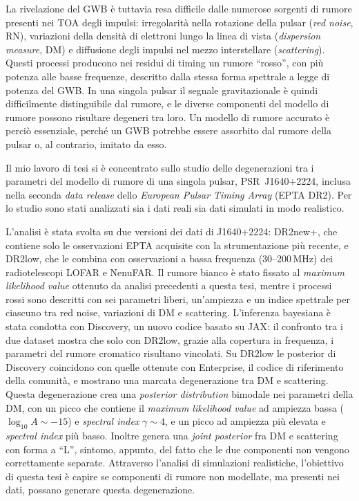 \documentclass[12pt]{report}
\begin{document}
La rivelazione del GWB è tuttavia resa difficile dalle numerose sorgenti di rumore
presenti nei TOA degli impulsi: irregolarità nella rotazione della pulsar
(\textit{red noise}, RN), variazioni della densità di elettroni lungo la linea di
vista (\textit{dispersion measure}, DM) e diffusione degli impulsi nel mezzo
interstellare (\textit{scattering}). Questi processi producono nei residui di
timing un rumore ``rosso'', con più potenza alle basse frequenze, descritto dalla
stessa forma spettrale a legge di potenza del GWB. In una singola pulsar il
segnale gravitazionale è quindi difficilmente distinguibile dal rumore, e le
diverse componenti del modello di rumore possono risultare degeneri tra loro.
Un modello di rumore accurato è perciò essenziale, perché un GWB potrebbe essere
assorbito dal rumore della pulsar o, al contrario, imitato da esso. \par

Il mio lavoro di tesi si è concentrato sullo studio delle degenerazioni tra i
parametri del modello di rumore di una singola pulsar, PSR~J1640+2224, inclusa
nella seconda \textit{data release} dello \textit{European Pulsar Timing Array}
(EPTA DR2). Per lo studio sono stati analizzati sia i dati reali sia dati simulati
in modo realistico. \par

L'analisi è stata svolta su due versioni dei dati di J1640+2224: DR2new+, che
contiene solo le osservazioni EPTA acquisite con la strumentazione più recente,
e DR2low, che le combina con osservazioni a bassa frequenza (30--200\,MHz) dei
radiotelescopi LOFAR e NenuFAR. Il rumore bianco è stato fissato al
\textit{maximum likelihood value} ottenuto da analisi precedenti a questa tesi,
mentre i processi rossi sono descritti con sei parametri liberi, un'ampiezza e un
indice spettrale per ciascuno tra red noise, variazioni di DM e scattering.
L'inferenza bayesiana è stata condotta con Discovery, un nuovo codice basato su
JAX: il confronto tra i due dataset mostra che solo con DR2low, grazie alla
copertura in frequenza, i parametri del rumore cromatico risultano vincolati. Su
DR2low le posterior di Discovery coincidono con quelle ottenute con Enterprise, il
codice di riferimento della comunità, e mostrano una marcata degenerazione tra DM
e scattering. Questa degenerazione crea una \textit{posterior distribution}
bimodale nei parametri della DM, con un picco che contiene il \textit{maximum
likelihood value} ad ampiezza bassa ($\log_{10}A \sim -15$) e \textit{spectral
index} $\gamma \sim 4$, e un picco ad ampiezza più elevata e \textit{spectral
index} più basso. Inoltre genera una \textit{joint posterior} fra DM e scattering
con forma a ``L'', sintomo, appunto, del fatto che le due componenti non vengono
correttamente separate. Attraverso l'analisi di simulazioni realistiche,
l'obiettivo di questa tesi è capire se componenti di rumore non modellate, ma
presenti nei dati, possano generare questa degenerazione. \par
\end{document}
